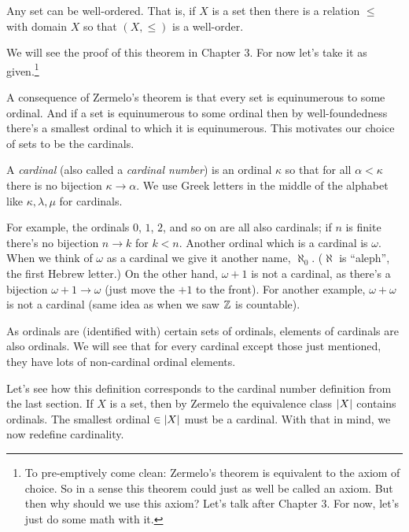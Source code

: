 \documentclass[10pt]{amsart}
\begin{document}
\begin{theorem}
Any set can be well-ordered. That is, if $X$ is a set then there is a relation $\le$ with domain $X$ so that $(X,\le)$ is a well-order.
\end{theorem}

We will see the proof of this theorem in Chapter 3. For now let's take it as given.\footnote{To pre-emptively come clean: Zermelo's theorem is equivalent to the axiom of choice. So in a sense this theorem could just as well be called an axiom. But then why should we use this axiom? Let's talk after Chapter 3. For now, let's just do some math with it.}

A consequence of Zermelo's theorem is that every set is equinumerous to some ordinal. And if a set is equinumerous to some ordinal then by well-foundedness there's a smallest ordinal to which it is equinumerous. This motivates our choice of sets to be the cardinals.

\begin{definition}
A \emph{cardinal} (also called a \emph{cardinal number}) is an ordinal $\kappa$ so that for all $\alpha < \kappa$ there is no bijection $\kappa \to \alpha$. We use Greek letters in the middle of the alphabet like $\kappa, \lambda, \mu$ for cardinals.
\end{definition}

For example, the ordinals $0$, $1$, $2$, and so on are all also cardinals; if $n$ is finite there's no bijection $n \to k$ for $k < n$. Another ordinal which is a cardinal is $\omega$. When we think of $\omega$ as a cardinal we give it another name, $\aleph_0$. ($\aleph$ is ``aleph'', the first Hebrew letter.) On the other hand, $\omega + 1$ is not a cardinal, as there's a bijection $\omega + 1 \to \omega$ (just move the $+1$ to the front). For another example, $\omega + \omega$ is not a cardinal (same idea as when we saw $\mathbb{Z}$ is countable).

As ordinals are (identified with) certain sets of ordinals, elements of cardinals are also ordinals. We will see that for every cardinal except those just mentioned, they have lots of non-cardinal ordinal elements.

Let's see how this definition corresponds to the cardinal number definition from the last section. If $X$ is a set, then by Zermelo the equivalence class $\left\lvert X \right\rvert$ contains ordinals. The smallest ordinal $\in \left\lvert X \right\rvert$ must be a cardinal. With that in mind, we now redefine cardinality.
\end{document}
